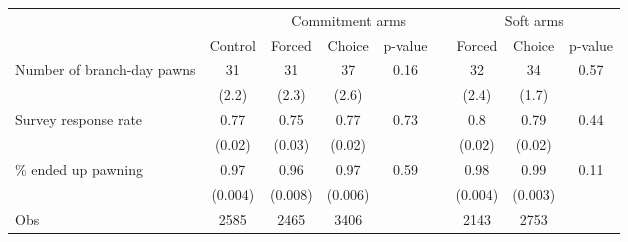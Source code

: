 \begin{tabular}{lcccccccc}
\toprule
      &       & \multicolumn{3}{c}{Commitment arms} &       & \multicolumn{3}{c}{Soft arms} \\
\cmidrule{3-5}\cmidrule{7-9}      & Control & Forced & Choice & p-value &       & Forced & Choice  & p-value \\
\midrule
\midrule
Number of branch-day pawns & 31    & 31    & 37    & 0.16  &       & 32    & 34    & 0.57 \\
      & (2.2) & (2.3) & (2.6) &       &       & (2.4) & (1.7) &  \\
Survey response rate & 0.77  & 0.75  & 0.77  & 0.73  &       & 0.8   & 0.79  & 0.44 \\
      & (0.02) & (0.03) & (0.02) &       &       & (0.02) & (0.02) &  \\
\% ended up pawning & 0.97  & 0.96  & 0.97  & 0.59  &       & 0.98  & 0.99  & 0.11 \\
      & (0.004) & (0.008) & (0.006) &       &       & (0.004) & (0.003) &  \\
\midrule
Obs   & 2585  & 2465  & 3406  &       &       & 2143  & 2753  &  \\
\bottomrule
\bottomrule
\end{tabular}%
